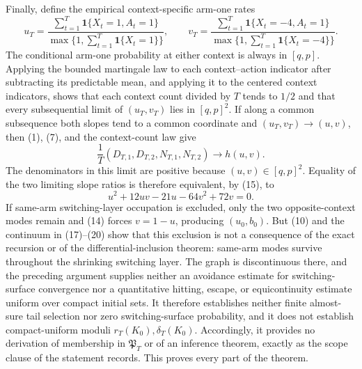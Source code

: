 Finally, define the empirical context-specific arm-one rates
\[
 u_T=\frac{\sum_{t=1}^T\mathbf1\{X_t=1,A_t=1\}}
 {\max\{1,\sum_{t=1}^T\mathbf1\{X_t=1\}\}},\qquad
 v_T=\frac{\sum_{t=1}^T\mathbf1\{X_t=-4,A_t=1\}}
 {\max\{1,\sum_{t=1}^T\mathbf1\{X_t=-4\}\}}.
\]
The conditional arm-one probability at either context is always in \([q,p]\).  Applying the bounded martingale law to each context--action indicator after subtracting its predictable mean, and applying it to the centered context indicators, shows that each context count divided by \(T\) tends to \(1/2\) and that every subsequential limit of \((u_T,v_T)\) lies in \([q,p]^2\).  If along a common subsequence both slopes tend to a common coordinate and \((u_T,v_T)\to(u,v)\), then (1), (7), and the context-count law give
\[
 \frac1T(D_{T,1},D_{T,2},N_{T,1},N_{T,2})\longrightarrow h(u,v).
\]
The denominators in this limit are positive because \((u,v)\in[q,p]^2\).  Equality of the two limiting slope ratios is therefore equivalent, by (15), to
\[
 u^2+12uv-21u-64v^2+72v=0.
\]
If same-arm switching-layer occupation is excluded, only the two opposite-context modes remain and (14) forces \(v=1-u\), producing \((u_0,b_0)\).  But (10) and the continuum in (17)--(20) show that this exclusion is not a consequence of the exact recursion or of the differential-inclusion theorem: same-arm modes survive throughout the shrinking switching layer.  The graph is discontinuous there, and the preceding argument supplies neither an avoidance estimate for switching-surface convergence nor a quantitative hitting, escape, or equicontinuity estimate uniform over compact initial sets.  It therefore establishes neither finite almost-sure tail selection nor zero switching-surface probability, and it does not establish compact-uniform moduli \(r_T(K_0),\delta_T(K_0)\).  Accordingly, it provides no derivation of membership in \(\mathfrak P_T\) or of an inference theorem, exactly as the scope clause of the statement records.  This proves every part of the theorem.